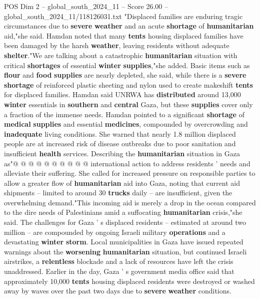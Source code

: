 \begin{textsample}{POS Dim 2 – global\_south\_2024\_11 – Score 26.00 – global\_south\_2024\_11/118126031.txt}  \label{ex:f2_pos_244}
"Displaced families are enduring tragic circumstances due to \textbf{severe} \textbf{weather} and an acute \textbf{shortage} of \textbf{humanitarian} aid,"she said.
Hamdan noted that many \textbf{tents} housing displaced families have been damaged by the harsh \textbf{weather}, leaving residents without adequate \textbf{shelter}."We are talking about a catastrophic \textbf{humanitarian} situation with critical \textbf{shortages} of essential \textbf{winter} \textbf{supplies},"she added.
Basic items such as \textbf{flour} and \textbf{food} \textbf{supplies} are nearly depleted, she said, while there is a \textbf{severe} \textbf{shortage} of reinforced plastic sheeting and nylon used to create makeshift \textbf{tents} for displaced families.
Hamdan said UNRWA has \textbf{distributed} around 13,000 \textbf{winter} essentials in \textbf{southern} and \textbf{central} Gaza, but these \textbf{supplies} cover only a fraction of the immense needs.
Hamdan pointed to a significant \textbf{shortage} of \textbf{medical} \textbf{supplies} and essential \textbf{medicines}, compounded by overcrowding and \textbf{inadequate} living conditions.
She warned that nearly 1.8 million displaced people are at increased risk of disease outbreaks due to poor sanitation and insufficient \textbf{health} services.
Describing the \textbf{humanitarian} situation in Gaza as"@ @ @ @ @ @ @ @ @ @ international action to address residents ' needs and alleviate their suffering.
She called for increased pressure on responsible parties to allow a greater flow of \textbf{humanitarian} aid into Gaza, noting that current aid shipments -- limited to around 30 \textbf{trucks} daily -- are insufficient, given the overwhelming demand."This incoming aid is merely a drop in the ocean compared to the dire needs of Palestinians amid a suffocating \textbf{humanitarian} crisis,"she said.
The challenges for Gaza ' s displaced residents -- estimated at around two million -- are compounded by ongoing Israeli military \textbf{operations} and a devastating \textbf{winter} \textbf{storm}.
Local municipalities in Gaza have issued repeated warnings about the \textbf{worsening} \textbf{humanitarian} situation, but continued Israeli airstrikes, a \textbf{relentless} blockade and a lack of resources have left the crisis unaddressed.
Earlier in the day, Gaza ' s government media office said that approximately 10,000 \textbf{tents} housing displaced residents were destroyed or washed away by waves over the past two days due to \textbf{severe} \textbf{weather} conditions.

\end{textsample}
